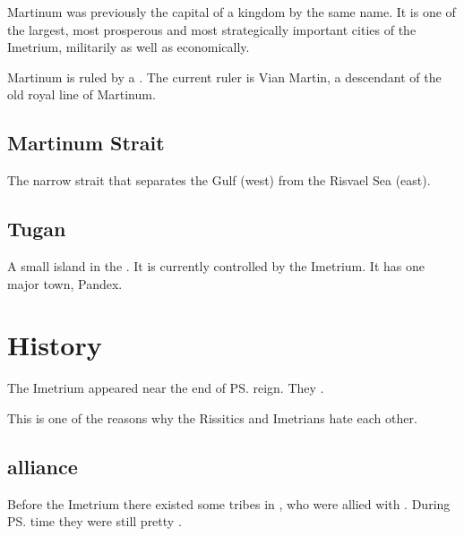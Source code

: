 Martinum was previously the capital of a kingdom by the same name. It is one of the largest, most prosperous and most strategically important cities of the Imetrium, militarily as well as economically. 

Martinum is ruled by a .
The current ruler is Vian Martin, a descendant of the old royal line of Martinum. 





\subsection{Martinum Strait}
The narrow strait that separates the \Samure{} Gulf (west) from the Risvael Sea (east). 





\subsection{Tugan}
A small island in the \Risvaelsea. It is currently controlled by the Imetrium. It has one major town, Pandex. 















\section{History}
The Imetrium appeared near the end of \ps{\Ortaica}{} reign. 
They . 

This is one of the reasons why the Rissitics and Imetrians hate each other. 









\subsection[Nycaneer alliance]{\Nycaneer{} alliance}
Before the Imetrium there existed some \nycaneer{} tribes in \Ortaica, who were allied with \nycans. 
During \ps{\Ortaica} time they were still pretty \Wylde{}. 

